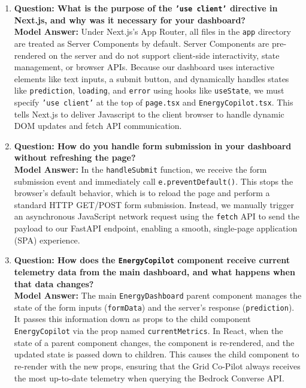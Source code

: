 \documentclass[11pt,a4paper]{article}
\begin{document}
\begin{enumerate}[leftmargin=*]
    \item \textbf{Question: What is the purpose of the \texttt{'use client'} directive in Next.js, and why was it necessary for your dashboard?}
    \\ \textbf{Model Answer:} Under Next.js's App Router, all files in the \texttt{app} directory are treated as Server Components by default. Server Components are pre-rendered on the server and do not support client-side interactivity, state management, or browser APIs. Because our dashboard uses interactive elements like text inputs, a submit button, and dynamically handles states like \texttt{prediction}, \texttt{loading}, and \texttt{error} using hooks like \texttt{useState}, we must specify \texttt{'use client'} at the top of \texttt{page.tsx} and \texttt{EnergyCopilot.tsx}. This tells Next.js to deliver Javascript to the client browser to handle dynamic DOM updates and fetch API communication.

    \item \textbf{Question: How do you handle form submission in your dashboard without refreshing the page?}
    \\ \textbf{Model Answer:} In the \texttt{handleSubmit} function, we receive the form submission event and immediately call \texttt{e.preventDefault()}. This stops the browser's default behavior, which is to reload the page and perform a standard HTTP GET/POST form submission. Instead, we manually trigger an asynchronous JavaScript network request using the \texttt{fetch} API to send the payload to our FastAPI endpoint, enabling a smooth, single-page application (SPA) experience.

    \item \textbf{Question: How does the \texttt{EnergyCopilot} component receive current telemetry data from the main dashboard, and what happens when that data changes?}
    \\ \textbf{Model Answer:} The main \texttt{EnergyDashboard} parent component manages the state of the form inputs (\texttt{formData}) and the server's response (\texttt{prediction}). It passes this information down as props to the child component \texttt{EnergyCopilot} via the prop named \texttt{currentMetrics}. In React, when the state of a parent component changes, the component is re-rendered, and the updated state is passed down to children. This causes the child component to re-render with the new props, ensuring that the Grid Co-Pilot always receives the most up-to-date telemetry when querying the Bedrock Converse API.


\end{enumerate}
\end{document}

